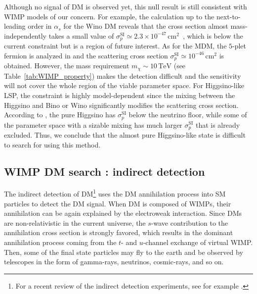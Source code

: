 \documentclass[12pt,twoside,book]{article}
\begin{document}
Although no signal of DM is observed yet, this null result is still consistent with WIMP models of our concern.
For example, the calculation up to the next-to-leading order in $\alpha_s$ for the Wino DM reveals that the cross section almost mass-independently takes a small value of $\sigma_p^{\mathrm{SI}} \simeq 2.3 \times 10^{-47}\,\mathrm{cm}^2$~\cite{Hisano:2015rsa}, which is below the current constraint but is a region of future interest.
As for the MDM, the $5$-plet fermion is analyzed in \cite{Hisano:2011cs} and the scattering cross section $\sigma_p^{\mathrm{SI}} \simeq 10^{-46}\,\mathrm{cm}^2$ is obtained.
However, the mass requirement $m_\chi \sim 10\,\mathrm{TeV}$ (see Table~\ref{tab:WIMP_property}) makes the detection difficult and the sensitivity will not cover the whole region of the viable parameter space.
For Higgsino-like LSP, the constraint is highly model-dependent since the mixing between the Higgsino and Bino or Wino significantly modifies the scattering cross section.
According to \cite{Hisano:2012wm, Roszkowski:2014wqa}, the pure Higgsino has $\sigma_p^{\mathrm{SI}}$ below the neutrino floor, while some of the parameter space with a sizable mixing has much larger $\sigma_p^{\mathrm{SI}}$ that is already excluded.
Thus, we conclude that the almost pure Higgsino-like state is difficult to search for using this method.



\subsection{WIMP DM search : indirect detection}
\label{sec:indirect_detection}

The indirect detection of DM\footnote{
  For a recent review of the indirect detection experiments, see for example \cite{Gaskins:2016cha}.
}
uses the DM annihilation process into SM particles to detect the DM signal.
When DM is composed of WIMPs, their annihilation can be again explained by the electroweak interaction.
Since DMs are non-relativistic in the current universe, the $s$-wave contribution to the annihilation cross section is strongly favored, which results in the dominant annihilation process coming from the $t$- and $u$-channel exchange of virtual WIMP.
Then, some of the final state particles may fly to the earth and be observed by telescopes in the form of gamma-rays, neutrinos, cosmic-rays, and so on.
\end{document}
